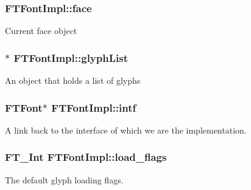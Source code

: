 \subsubsection[{\texorpdfstring{face}{face}}]{ F\+T\+Font\+Impl\+::face\hspace{0.3cm}{\ttfamily [protected]}}\hypertarget{class_f_t_font_impl_ab35b9e1966574c6bb88bff520e9c33df}{}\label{class_f_t_font_impl_ab35b9e1966574c6bb88bff520e9c33df}
Current face object 
\subsubsection[{\texorpdfstring{glyph\+List}{glyphList}}]{$\ast$ F\+T\+Font\+Impl\+::glyph\+List\hspace{0.3cm}{\ttfamily [private]}}\hypertarget{class_f_t_font_impl_a32498496c03476febf0e8291dcab28a6}{}\label{class_f_t_font_impl_a32498496c03476febf0e8291dcab28a6}
An object that holds a list of glyphs 
\subsubsection[{\texorpdfstring{intf}{intf}}]{\setlength{\rightskip}{0pt plus 5cm}F\+T\+Font$\ast$ F\+T\+Font\+Impl\+::intf\hspace{0.3cm}{\ttfamily [private]}}\hypertarget{class_f_t_font_impl_a28128c35b1fb792c49c19a48886113a3}{}\label{class_f_t_font_impl_a28128c35b1fb792c49c19a48886113a3}
A link back to the interface of which we are the implementation. 
\subsubsection[{\texorpdfstring{load\+\_\+flags}{load_flags}}]{\setlength{\rightskip}{0pt plus 5cm}F\+T\+\_\+\+Int F\+T\+Font\+Impl\+::load\+\_\+flags\hspace{0.3cm}{\ttfamily [protected]}}\hypertarget{class_f_t_font_impl_a217737b273e6abaa0dd6d837d5677e56}{}\label{class_f_t_font_impl_a217737b273e6abaa0dd6d837d5677e56}
The default glyph loading flags. 
